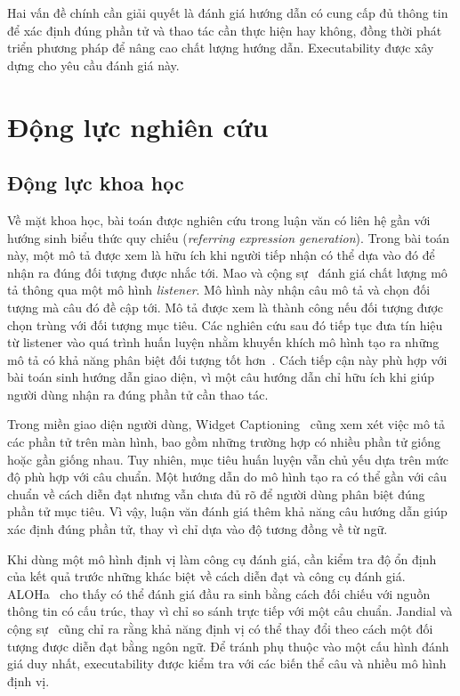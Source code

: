 Hai vấn đề chính cần giải quyết là đánh giá hướng dẫn có cung cấp đủ thông tin để xác định đúng phần tử và thao tác cần thực hiện hay không, đồng thời phát triển phương pháp để nâng cao chất lượng hướng dẫn. Executability được xây dựng cho yêu cầu đánh giá này.

\section{Động lực nghiên cứu}\label{sec:1.2}

\subsection{Động lực khoa học}\label{sec:1.2.1}

Về mặt khoa học, bài toán được nghiên cứu trong luận văn có liên hệ gần với hướng sinh biểu thức quy chiếu (\emph{referring expression generation}). Trong bài toán này, một mô tả được xem là hữu ích khi người tiếp nhận có thể dựa vào đó để nhận ra đúng đối tượng được nhắc tới. Mao và cộng sự~\cite{mao2016} đánh giá chất lượng mô tả thông qua một mô hình \emph{listener}. Mô hình này nhận câu mô tả và chọn đối tượng mà câu đó đề cập tới. Mô tả được xem là thành công nếu đối tượng được chọn trùng với đối tượng mục tiêu. Các nghiên cứu sau đó tiếp tục đưa tín hiệu từ listener vào quá trình huấn luyện nhằm khuyến khích mô hình tạo ra những mô tả có khả năng phân biệt đối tượng tốt hơn~\cite{luo2017,yu2017}. Cách tiếp cận này phù hợp với bài toán sinh hướng dẫn giao diện, vì một câu hướng dẫn chỉ hữu ích khi giúp người dùng nhận ra đúng phần tử cần thao tác.

Trong miền giao diện người dùng, Widget Captioning~\cite{widgetcap} cũng xem xét việc mô tả các phần tử trên màn hình, bao gồm những trường hợp có nhiều phần tử giống hoặc gần giống nhau. Tuy nhiên, mục tiêu huấn luyện vẫn chủ yếu dựa trên mức độ phù hợp với câu chuẩn. Một hướng dẫn do mô hình tạo ra có thể gần với câu chuẩn về cách diễn đạt nhưng vẫn chưa đủ rõ để người dùng phân biệt đúng phần tử mục tiêu. Vì vậy, luận văn đánh giá thêm khả năng câu hướng dẫn giúp xác định đúng phần tử, thay vì chỉ dựa vào độ tương đồng về từ ngữ.

Khi dùng một mô hình định vị làm công cụ đánh giá, cần kiểm tra độ ổn định của kết quả trước những khác biệt về cách diễn đạt và công cụ đánh giá. ALOHa~\cite{aloha} cho thấy có thể đánh giá đầu ra sinh bằng cách đối chiếu với nguồn thông tin có cấu trúc, thay vì chỉ so sánh trực tiếp với một câu chuẩn. Jandial và cộng sự~\cite{groundersunderstand} cũng chỉ ra rằng khả năng định vị có thể thay đổi theo cách một đối tượng được diễn đạt bằng ngôn ngữ. Để tránh phụ thuộc vào một cấu hình đánh giá duy nhất, executability được kiểm tra với các biến thể câu và nhiều mô hình định vị.

